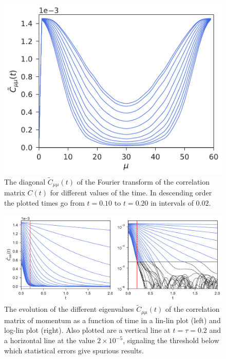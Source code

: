 \documentclass[b5paper,openright,10pt]{book}
\begin{document}
\begin{figure}[h!]
  \centering
  \includegraphics[scale=0.41]{CtFourier-PBC}
  \caption[Diagonal $\tilde{C}_{\mu\nu}(t)$ for an unconfined fluid]{The diagonal $\tilde{C}_{\mu\mu}(t)$ of the Fourier transform
  of the correlation  matrix $C(t)$ for different values  of the time.
In      descending     order      the     plotted      times go from $t=0.10$ to $t=0.20$ in intervals of $0.02$. }
\label{fig:CtFourier-PBC}
\end{figure}

\begin{figure}[h!]
  \centering
  \includegraphics[width=\linewidth]{CtFourier-PBC-exp}
  \caption[Evolution of different eigenvalues $\tilde{C}_{\mu\nu}(t)$ for an unconfined fluid]{
  The  evolution of  the different
  eigenvalues  $\tilde{C}_{\mu\mu}(t)$ of  the  correlation matrix  of
  momentum  as  a  function  of   time  in  a  lin-lin  plot  (left)
  and   log-lin   plot
  (right). Also  plotted are  a vertical line  at $t=\tau=0.2$  and a
  horizontal  line  at  the   value  $2\times10^{-5}$,  signaling  the
  threshold below which statistical errors give spurious results. }
\label{fig:CtFourier-PBC-exp}
\end{figure}
\end{document}
